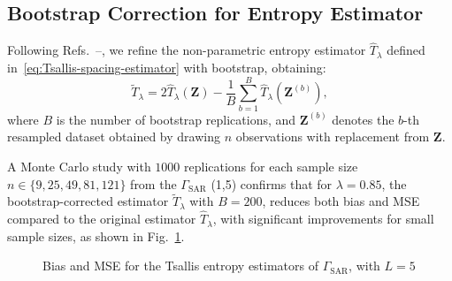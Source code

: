 \documentclass[
  lettersize  journal,
]{IEEEtran}%
\begin{document}
\subsection{Bootstrap Correction for Entropy
Estimator}\label{bootstrap-correction-for-entropy-estimator}

Following
Refs.~--,
we refine the non-parametric entropy estimator \(\widehat{T}_{\lambda}\)
defined in~\eqref{eq:Tsallis-spacing-estimator} with bootstrap,
obtaining: \begin{equation*}
\widetilde{T}_{\lambda} = 2\widehat{T}_{\lambda}(\bm{Z}) - \frac{1}{B} \sum_{b=1}^{B} \widehat{T}_{\lambda}(\bm{Z}^{(b)}),
\end{equation*} where \(B\) is the number of bootstrap replications, and
\(\bm{Z}^{(b)}\) denotes the \(b\)-th resampled dataset obtained by
drawing \(n\) observations with replacement from \(\bm{Z}\).

A Monte Carlo study with \(1000\) replications for each sample size
\(n \in \{9, 25, 49, 81, 121\}\) from the \(\Gamma_{\text{SAR}}\) (1,5)
confirms that for \(\lambda=0.85\), the bootstrap-corrected estimator
\(\widetilde{T}_{\lambda}\) with \(B=200\), reduces both bias and MSE
compared to the original estimator \(\widehat{T}_{\lambda}\), with
significant improvements for small sample sizes, as shown in
Fig.~\ref{fig-bias_mse_Tsallis}.

\begin{figure}[H]


\caption{\label{fig-bias_mse_Tsallis}Bias and MSE for the Tsallis
entropy estimators of \(\Gamma_{\text{SAR}}\), with \(L=5\)}

\end{figure}%
\end{document}
